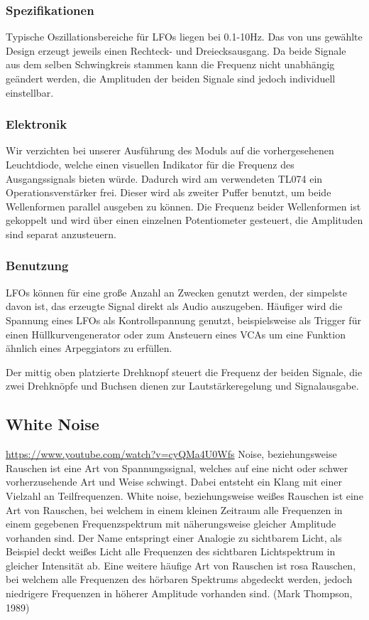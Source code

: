 \subsubsection{Spezifikationen}
\label{sec:org1cfb29d}
Typische Oszillationsbereiche für LFOs liegen bei 0.1-10Hz. Das  von uns gewählte Design erzeugt jeweils einen Rechteck- und Dreiecksausgang. Da beide Signale aus dem selben Schwingkreis stammen kann die Frequenz nicht unabhängig geändert werden, die Amplituden der beiden Signale sind jedoch individuell einstellbar.

\subsubsection{Elektronik}
\label{sec:org93db2d7}
Wir verzichten bei unserer Ausführung des Moduls auf die vorhergesehenen Leuchtdiode, welche einen visuellen Indikator für die Frequenz des Ausgangssignals bieten würde. Dadurch wird am verwendeten TL074 ein Operationsverstärker frei. Dieser wird als zweiter Puffer benutzt, um beide Wellenformen parallel ausgeben zu können. Die Frequenz beider Wellenformen ist gekoppelt und wird über einen einzelnen Potentiometer gesteuert, die Amplituden sind separat anzusteuern.

\subsubsection{Benutzung}
\label{sec:org21718ef}
LFOs können für eine große Anzahl an Zwecken genutzt werden, der simpelste davon ist, das erzeugte Signal direkt als Audio auszugeben. Häufiger wird die Spannung eines LFOs als Kontrollspannung genutzt, beispielsweise als Trigger für einen Hüllkurvengenerator oder zum Ansteuern eines VCAs um eine Funktion ähnlich eines Arpeggiators zu erfüllen.

Der mittig oben platzierte Drehknopf steuert die Frequenz der beiden Signale, die zwei Drehknöpfe und Buchsen dienen zur Lautstärkeregelung und Signalausgabe.

\subsection{White Noise}
\label{sec:org410db92}
\url{https://www.youtube.com/watch?v=cyQMa4U0Wfs}
Noise, beziehungsweise Rauschen ist eine Art von Spannungssignal, welches auf eine nicht oder schwer vorherzusehende Art und Weise schwingt. Dabei entsteht ein Klang mit einer Vielzahl an Teilfrequenzen. White noise, beziehungsweise weißes Rauschen ist eine Art von Rauschen, bei welchem in einem kleinen Zeitraum alle Frequenzen in einem gegebenen Frequenzspektrum mit näherungsweise gleicher Amplitude vorhanden sind. Der Name entspringt einer Analogie zu sichtbarem Licht, als Beispiel deckt weißes Licht alle Frequenzen des sichtbaren Lichtspektrum in gleicher Intensität ab. Eine weitere häufige Art von Rauschen ist rosa Rauschen, bei welchem alle Frequenzen des hörbaren Spektrums abgedeckt werden, jedoch niedrigere Frequenzen in höherer Amplitude vorhanden sind.
(Mark Thompson, 1989)

